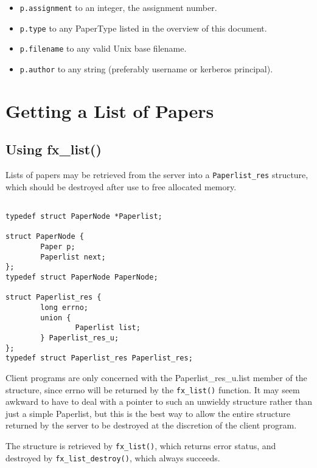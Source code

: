 \begin{itemize}

\item {\tt p.assignment} to an integer, the assignment number.

\item {\tt p.type} to any PaperType listed in the overview of this
document.

\item {\tt p.filename} to any valid Unix base filename.

\item {\tt p.author} to any string (preferably username or kerberos
principal).

\end{itemize}

\section{Getting a List of Papers}

\subsection{Using fx\_list()}

Lists of papers may be retrieved from the
server into a \verb+Paperlist_res+ structure, which should be
destroyed after use to free allocated memory.

\begin{verbatim}

typedef struct PaperNode *Paperlist;

struct PaperNode {
        Paper p;
        Paperlist next;
};
typedef struct PaperNode PaperNode;

struct Paperlist_res {
        long errno;
        union {
                Paperlist list;
        } Paperlist_res_u;
};
typedef struct Paperlist_res Paperlist_res;

\end{verbatim}

Client programs are only concerned with the Paperlist\_res\_u.list
member of the structure, since errno will be returned by the
\verb+fx_list()+ function.  It may seem awkward to have to deal
with a pointer to such an unwieldy structure rather than just a simple
Paperlist, but this is the best way to allow the entire structure
returned by the server to be destroyed at the discretion of the
client program.

The structure is retrieved by \verb+fx_list()+, which returns
error status, and destroyed by \verb+fx_list_destroy()+, which
always succeeds.

